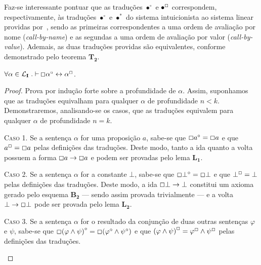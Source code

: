     Faz-se interessante pontuar que as traduções $\bullet^\circ$ e $\bullet^\Box$ correspondem, respectivamente, às traduções $\bullet^\circ$ e $\bullet^*$ do sistema intuicionista ao sistema linear providas por~\cite{Girard}, sendo as primeiras correspondentes a uma ordem de avaliação por nome (\textit{call-by-name}) e as segundas a uma ordem de avaliação por valor (\textit{call-by-value}). 
    Ademais, as duas traduções providas são equivalentes, conforme demonstrado pelo teorema $\mathbf{T_2}$.

    \begin{theorem}
        $\forall\alpha\in\mathcal{L}_\mathbf{I}\mathrel{.}\mathop{\vdash}\Box\alpha^\circ\leftrightarrow\alpha^\Box$.

        \begin{proof}
            Prova por indução forte sobre a profundidade de $\alpha$.
            Assim, suponhamos que as traduções equivalham para qualquer $\alpha$ de profundidade $n<k$.
            Demonstraremos, analisando-se os casos, que as traduções equivalem para qualquer $\alpha$ de profundidade $n=k$.
    
            \begin{case}
                \textsc{Caso 1.}
                Se a sentença $\alpha$ for uma proposição $a$, sabe-se que $\Box a^\circ=\Box a$ e que $a^\Box =\Box a$ pelas definições das traduções.
                Deste modo, tanto a ida quanto a volta possuem a forma $\Box a\to\Box a$ e podem ser provadas pelo lema $\mathbf{L_1}$.
            \end{case}

            \begin{case}
                \textsc{Caso 2.}
                Se a sentença $\alpha$ for a constante $\bot$, sabe-se que $\Box\bot^\circ=\Box\bot$ e que $\bot^\Box=\bot$ pelas definições das traduções.
                Deste modo, a ida $\Box\bot\to\bot$ constitui um axioma gerado pelo esquema $\mathbf{B_2}$ --- sendo assim provada trivialmente --- e a volta $\bot\to\Box\bot$ pode ser provada pelo lema $\mathbf{L_2}$.
            \end{case}
    
            \begin{case}
                \textsc{Caso 3.}
                Se a sentença $\alpha$ for o resultado da conjunção de duas outras sentenças $\varphi$ e $\psi$, sabe-se que $\Box{(\varphi\wedge\psi)}^\circ=\Box(\varphi^\circ\wedge\psi^\circ)$ e que ${(\varphi\wedge\psi)}^\Box=\varphi^\Box\wedge\psi^\Box$ pelas definições das traduções.
            \end{case}


\end{proof}
\end{theorem}
